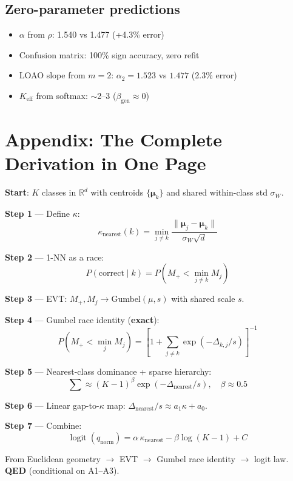 \documentclass[11pt,a4paper]{article}
\DeclareMathOperator{\logit}{logit}
\begin{document}
\subsection{Zero-parameter predictions}
\begin{itemize}[nosep]
\item $\alpha$ from $\rho$: 1.540 vs 1.477 (+4.3\% error)
\item Confusion matrix: 100\% sign accuracy, zero refit
\item LOAO slope from $m{=}2$: $\alpha_2 = 1.523$ vs $1.477$ (2.3\% error)
\item $K_\mathrm{eff}$ from softmax: $\sim$2--3 ($\beta_\mathrm{gen} \approx 0$)
\end{itemize}

\section*{Appendix: The Complete Derivation in One Page}

\begin{derivbox}
\textbf{Start}: $K$ classes in $\mathbb{R}^d$ with centroids $\{\boldsymbol{\mu}_k\}$ and shared within-class std $\sigma_W$.

\textbf{Step 1} --- Define $\kappa$:
\[
\kappa_\mathrm{nearest}(k) = \min_{j\neq k} \frac{\|\boldsymbol{\mu}_j - \boldsymbol{\mu}_k\|}{\sigma_W\sqrt{d}}
\]

\textbf{Step 2} --- 1-NN as a race:
\[
P(\text{correct} \mid k) = P(M_+ < \min_{j\neq k} M_j)
\]

\textbf{Step 3} --- EVT: $M_+, M_j \to \mathrm{Gumbel}(\mu, s)$ with shared scale $s$.

\textbf{Step 4} --- Gumbel race identity (\textbf{exact}):
\[
P(M_+ < \min_j M_j) = \left[1 + \textstyle\sum_{j\neq k} \exp(-\Delta_{k,j}/s)\right]^{-1}
\]

\textbf{Step 5} --- Nearest-class dominance + sparse hierarchy:
\[
\textstyle\sum \approx (K{-}1)^\beta \exp(-\Delta_\mathrm{nearest}/s), \quad \beta \approx 0.5
\]

\textbf{Step 6} --- Linear gap-to-$\kappa$ map: $\Delta_\mathrm{nearest}/s \approx a_1 \kappa + a_0$.

\textbf{Step 7} --- Combine:
\[
\boxed{\logit(q_\mathrm{norm}) = \alpha\,\kappa_\mathrm{nearest} - \beta\log(K{-}1) + C}
\]

From Euclidean geometry $\to$ EVT $\to$ Gumbel race identity $\to$ logit law. \textbf{QED} (conditional on A1--A3).
\end{derivbox}
\end{document}
